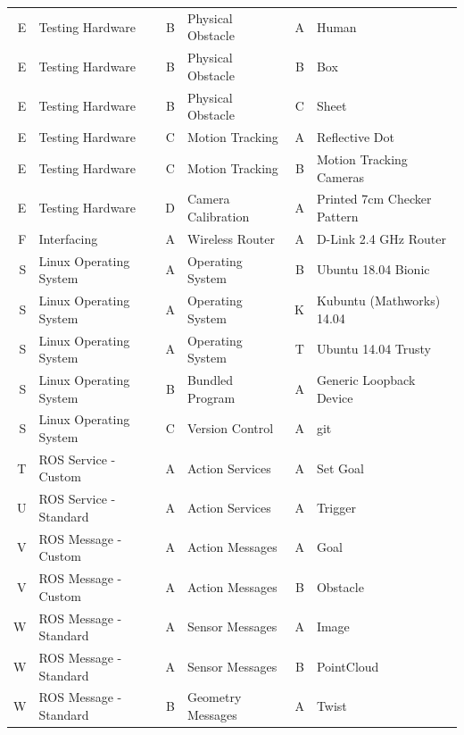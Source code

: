 \documentclass{article}[12]
\begin{document}
\begin{table}
\begin{tabular}{|rl|rl|rl|}
			E & Testing Hardware       & B & Physical Obstacle  & A   & Human                             \\
			E & Testing Hardware       & B & Physical Obstacle  & B   & Box                               \\
			E & Testing Hardware       & B & Physical Obstacle  & C   & Sheet                             \\
			E & Testing Hardware       & C & Motion Tracking    & A   & Reflective Dot                    \\
			E & Testing Hardware       & C & Motion Tracking    & B   & Motion Tracking Cameras           \\
			E & Testing Hardware       & D & Camera Calibration & A   & Printed 7cm Checker Pattern       \\ \hline
			F & Interfacing            & A & Wireless Router    & A   & D-Link 2.4 GHz Router             \\ \hline
			S & Linux Operating System & A & Operating System   & B   & Ubuntu 18.04 Bionic               \\
			S & Linux Operating System & A & Operating System   & K   & Kubuntu (Mathworks) 14.04         \\
			S & Linux Operating System & A & Operating System   & T   & Ubuntu 14.04 Trusty               \\
			S & Linux Operating System & B & Bundled Program    & A   & Generic Loopback Device           \\
			S & Linux Operating System & C & Version Control    & A   & git                               \\ \hline
			T & ROS Service - Custom   & A & Action Services    & A   & Set Goal                          \\ \hline
			U & ROS Service - Standard & A & Action Services    & A   & Trigger                           \\ \hline
			V & ROS Message - Custom   & A & Action Messages    & A   & Goal                              \\
			V & ROS Message - Custom   & A & Action Messages    & B   & Obstacle                          \\ \hline
			W & ROS Message - Standard & A & Sensor Messages    & A   & Image                             \\
			W & ROS Message - Standard & A & Sensor Messages    & B   & PointCloud                        \\
			W & ROS Message - Standard & B & Geometry Messages  & A   & Twist                             \\

\end{tabular}
\end{table}
\end{document}
